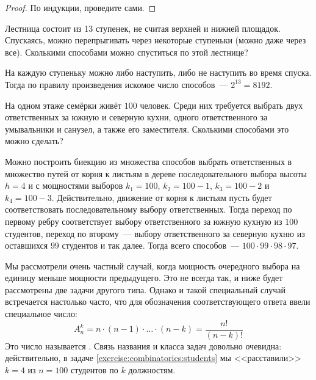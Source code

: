 \begin{proof}
    По индукции, проведите сами.
\end{proof}


\begin{Exercise}[counter=SecExercise, label={exercise:combinatorics:stairs}]
    \noindent
    Лестница состоит из 13 ступенек, не считая верхней и нижней площадок.
    Спускаясь, можно перепрыгивать через некоторые ступеньки (можно даже через все).
    Сколькими способами можно спуститься по этой лестнице?
\end{Exercise}

\begin{Answer}
    \noindent
    На каждую ступеньку можно либо наступить, либо не наступить во время спуска.
    Тогда по правилу произведения искомое число способов~--- $ 2^{13} = 8192 $.
\end{Answer}


\begin{Exercise}[counter=SecExercise, label={exercise:combinatorics:students}]
    \noindent
    На одном этаже семёрки живёт $ 100 $ человек.
    Среди них требуется выбрать двух ответственных за южную и северную кухни, одного ответственного за умывальники и санузел, а также его заместителя.
    Сколькими способами это можно сделать?
\end{Exercise}

\begin{Answer}
    \noindent
    Можно построить биекцию из множества способов выбрать ответственных в множество путей от корня к листьям в дереве последовательного выбора высоты $ h = 4 $
    и с мощностями выборов $ k_1 = 100 $, $ k_2 = 100 - 1 $, $ k_3 = 100 - 2 $ и $ k_4 = 100 - 3 $.
    Действительно, движение от корня к листьям пусть будет соответствовать последовательному выбору ответственных.
    Тогда переход по первому ребру соответствует выбору ответственного за южную кухную из $ 100 $ студентов, переход по второму~---
    выбору ответственного за северную кухню из оставшихся $ 99 $ студентов и так далее.
    Тогда всего способов~--- $ 100 \cdot 99 \cdot 98 \cdot 97 $.
\end{Answer}

Мы рассмотрели очень частный случай, когда мощность очередного выбора на единицу меньше мощности предыдущего.
Это не всегда так, и ниже будет рассмотрены две задачи другого типа.
Однако и такой специальный случай встречается настолько часто, что для обозначения соответствующего ответа ввели специальное число:
\[
    A_n^k = n \cdot (n-1) \cdot \ldots \cdot (n - k) = \frac{n!}{(n-k)!}
\]
Это число называется .
Связь названия и класса задач довольно очевидна:
действительно, в задаче \ref{exercise:combinatorics:students} мы <<расставили>> $ k = 4 $ из $ n = 100 $ студентов по $ k $ должностям.

